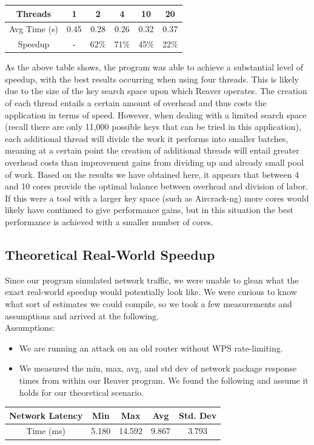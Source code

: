 \documentclass[a4paper]{article}
\begin{document}
\begin{center}
\begin{tabular}{ | c | c | c |c |c |c|  }
\hline
Threads &	1 &	2 &	4 & 10 & 20 \\
\hline
Avg Time (s) &	0.45 &	0.28 &	0.26 &	0.32 & 0.37  \\
\hline 
Speedup & - &	62\% &	71\% &	45\% & 22\%  \\
\hline
\end{tabular}
\end{center}

As the above table shows, the program was able to achieve a substantial level of speedup, with the best results occurring when using four threads. This is likely due to the size of the key search space upon which Reaver operates. The creation of each thread entails a certain amount of overhead and thus costs the application in terms of speed. However, when dealing with a limited search space (recall there are only 11,000 possible keys that can be tried in this application), each additional thread will divide the work it performs into smaller batches, meaning at a certain point the creation of additional threads will entail greater overhead costs than improvement gains from dividing up and already small pool of work. Based on the results we have obtained here, it appears that between 4 and 10 cores provide the optimal balance between overhead and division of labor. If this were a tool with a larger key space (such as Aircrack-ng) more cores would likely have continued to give performance gains, but in this situation the best performance is achieved with a smaller number of cores.

\subsection{Theoretical Real-World Speedup}
Since our program simulated network traffic, we were unable to glean what the exact
real-world speedup would potentially look like. We were curious to know what
sort of estimates we could compile, so we took a few measurements and assumptions
and arrived at the following.
\\
Assumptions:
\begin{itemize}
    \item We are running an attack on an old router without WPS rate-limiting. 
    \item We measured the min, max, avg, and std dev of network package response times from within our Reaver program. We found the following and assume it holds for our
    theoretical scenario.
    
\end{itemize}
\begin{center}
\begin{tabular}{ | c | c | c |c |c |  }
\hline
Network Latency  &	Min &	Max &	Avg & Std. Dev  \\
\hline
Time (ms) &	5.180 &	14.592 & 9.867  & 3.793  \\
\hline 
\end{tabular}
\end{center}
\end{document}
